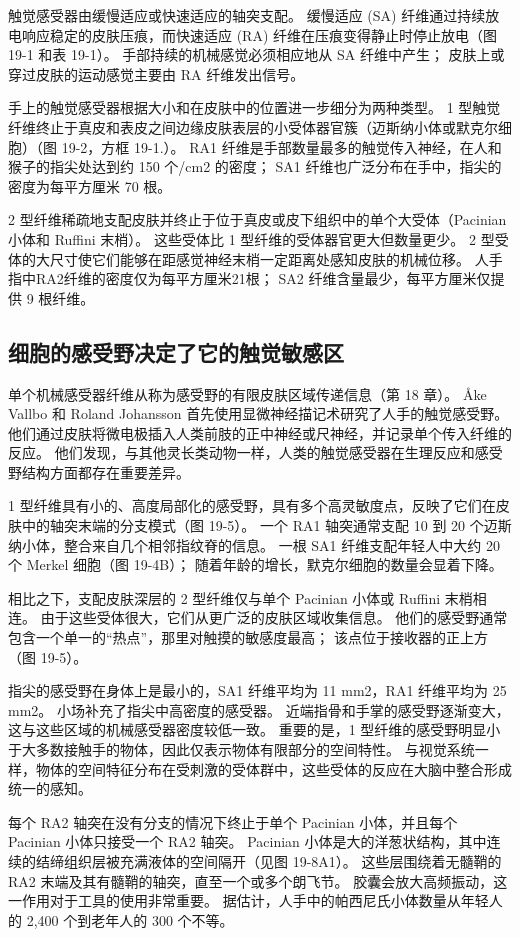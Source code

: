 触觉感受器由缓慢适应或快速适应的轴突支配。 缓慢适应 (SA) 纤维通过持续放电响应稳定的皮肤压痕，而快速适应 (RA) 纤维在压痕变得静止时停止放电（图 19-1 和表 19-1）。 手部持续的机械感觉必须相应地从 SA 纤维中产生； 皮肤上或穿过皮肤的运动感觉主要由 RA 纤维发出信号。

手上的触觉感受器根据大小和在皮肤中的位置进一步细分为两种类型。 1 型触觉纤维终止于真皮和表皮之间边缘皮肤表层的小受体器官簇（迈斯纳小体或默克尔细胞）（图 19-2，方框 19-1.）。 RA1 纤维是手部数量最多的触觉传入神经，在人和猴子的指尖处达到约 150 个/cm2 的密度； SA1 纤维也广泛分布在手中，指尖的密度为每平方厘米 70 根。

2 型纤维稀疏地支配皮肤并终止于位于真皮或皮下组织中的单个大受体（Pacinian 小体和 Ruffini 末梢）。 这些受体比 1 型纤维的受体器官更大但数量更少。 2 型受体的大尺寸使它们能够在距感觉神经末梢一定距离处感知皮肤的机械位移。 人手指中RA2纤维的密度仅为每平方厘米21根； SA2 纤维含量最少，每平方厘米仅提供 9 根纤维。


\subsection{细胞的感受野决定了它的触觉敏感区}
单个机械感受器纤维从称为感受野的有限皮肤区域传递信息（第 18 章）。 Åke Vallbo 和 Roland Johansson 首先使用显微神经描记术研究了人手的触觉感受野。 他们通过皮肤将微电极插入人类前肢的正中神经或尺神经，并记录单个传入纤维的反应。 他们发现，与其他灵长类动物一样，人类的触觉感受器在生理反应和感受野结构方面都存在重要差异。

1 型纤维具有小的、高度局部化的感受野，具有多个高灵敏度点，反映了它们在皮肤中的轴突末端的分支模式（图 19-5）。 一个 RA1 轴突通常支配 10 到 20 个迈斯纳小体，整合来自几个相邻指纹脊的信息。 一根 SA1 纤维支配年轻人中大约 20 个 Merkel 细胞（图 19-4B）； 随着年龄的增长，默克尔细胞的数量会显着下降。

相比之下，支配皮肤深层的 2 型纤维仅与单个 Pacinian 小体或 Ruffini 末梢相连。 由于这些受体很大，它们从更广泛的皮肤区域收集信息。 他们的感受野通常包含一个单一的“热点”，那里对触摸的敏感度最高； 该点位于接收器的正上方（图 19-5）。

指尖的感受野在身体上是最小的，SA1 纤维平均为 11 mm2，RA1 纤维平均为 25 mm2。 小场补充了指尖中高密度的感受器。 近端指骨和手掌的感受野逐渐变大，这与这些区域的机械感受器密度较低一致。 重要的是，1 型纤维的感受野明显小于大多数接触手的物体，因此仅表示物体有限部分的空间特性。 与视觉系统一样，物体的空间特征分布在受刺激的受体群中，这些受体的反应在大脑中整合形成统一的感知。

每个 RA2 轴突在没有分支的情况下终止于单个 Pacinian 小体，并且每个 Pacinian 小体只接受一个 RA2 轴突。 Pacinian 小体是大的洋葱状结构，其中连续的结缔组织层被充满液体的空间隔开（见图 19-8A1）。 这些层围绕着无髓鞘的 RA2 末端及其有髓鞘的轴突，直至一个或多个朗飞节。 胶囊会放大高频振动，这一作用对于工具的使用非常重要。 据估计，人手中的帕西尼氏小体数量从年轻人的 2,400 个到老年人的 300 个不等。

